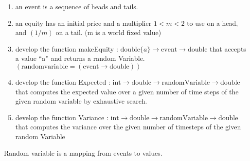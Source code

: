 \documentclass{article}
\begin{document}
\begin{enumerate}
\item an event is a sequence of heads and tails.

\item an equity has an initial price and a multiplier 
      $1 < m < 2$ to use on a head, and $(1 / m)$ on a tail. 
      (m is a world fixed value)

\item develop the function makeEquity : 
      $\mathrm{double} \{a\} \rightarrow 
       \mathrm{event} \rightarrow 
       \mathrm{double}$
      that accepts a value ``a'' and returns a random Variable.  
      $(\mathrm{random variable} = 
       (\mathrm{event} \rightarrow 
        \mathrm{double})) $

\item develop the function Expected : 
      $\mathrm{int} \rightarrow 
       \mathrm{double} \rightarrow 
       \mathrm{randomVariable} \rightarrow
       \mathrm{double}$
      that computes the expected value over a given number of time steps of 
      the given random variable by exhaustive search.

\item develop the function Variance : 
      $\mathrm{int} \rightarrow 
       \mathrm{double} \rightarrow 
       \mathrm{randomVariable} \rightarrow 
       \mathrm{double}$ 
      that computes the variance over the given number 
      of timesteps of the given random Variable

\end{enumerate}

Random variable is a mapping from events to values.
\end{document}
